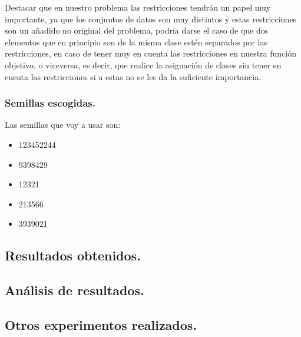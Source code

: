 \documentclass[12pt, spanish]{article}
\begin{document}
Destacar que en nuestro problema las restricciones tendrán un papel muy importante, ya que los conjuntos de datos son muy distintos y estas restricciones son un añadido no original del problema, podría darse el caso de que dos elementos que en principio son de la misma clase estén separados por las restricciones, en caso de tener muy en cuenta las restricciones en nuestra función objetivo, o viceversa, es decir, que realice la asignación de clases sin tener en cuenta las restricciones si a estas no se les da la suficiente importancia.



\subsubsection{Semillas escogidas.}

Las semillas que voy a usar son:

\begin{itemize}
	\item {123452244}
	\item {9398429}
	\item {12321}
	\item {213566}
	\item {3939021}
\end{itemize}

\newpage

\subsection{Resultados obtenidos.}


\newpage


\subsection{Análisis de resultados.	}

\subsection{Otros experimentos realizados.}
\end{document}
